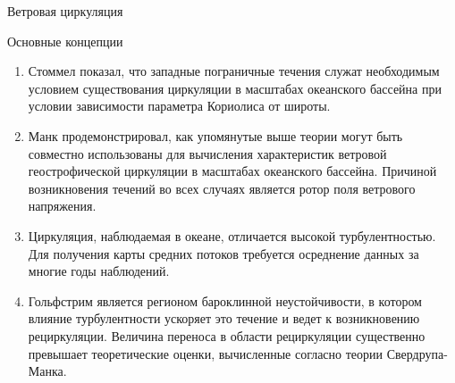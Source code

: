 \begin{chapter}{Ветровая циркуляция}
\begin{section}{Основные концепции}
\begin{enumerate}
\item 
Стоммел показал, что западные пограничные течения служат
необходимым условием существования циркуляции в масштабах океанского бассейна
при условии зависимости параметра Кориолиса
от широты.
%

\item 
Манк продемонстрировал, как упомянутые выше теории могут быть совместно
использованы для вычисления характеристик ветровой геострофической циркуляции%
 в масштабах океанского бассейна.
Причиной возникновения течений во всех случаях является ротор поля ветрового
напряжения.
%

\item
Циркуляция, наблюдаемая в океане, отличается высокой турбулентностью.
Для получения карты средних потоков требуется осреднение данных
за многие годы наблюдений. 
%

\item 
Гольфстрим является регионом бароклинной неустойчивости,
в котором влияние турбулентности
ускоряет это течение и ведет к возникновению рециркуляции. Величина переноса
в области рециркуляции существенно превышает теоретические 
оценки, вычисленные согласно теории Свердрупа-Манка.
%
\end{enumerate}
\end{section}
\end{chapter}